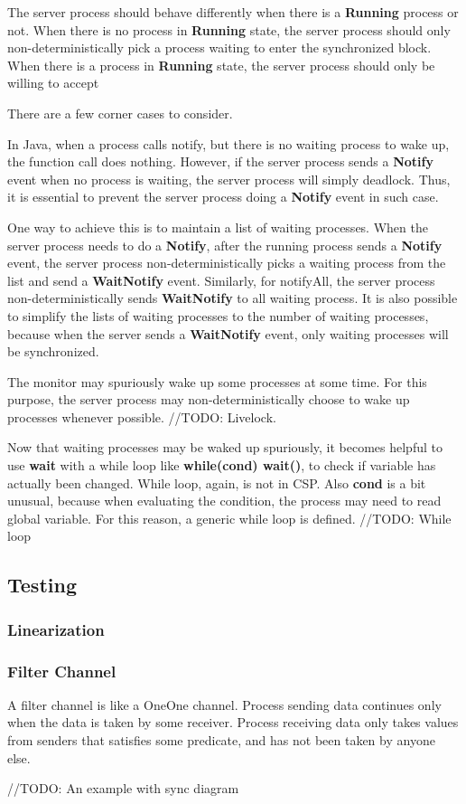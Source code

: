 \documentclass{article}
\begin{document}
The server process should behave differently when there is a \textbf{Running} process or not. When there is no process in \textbf{Running} state, the server process should only non-deterministically pick a process waiting to enter the synchronized block. When there is a process in \textbf{Running} state, the server process should only be willing to accept 

There are a few corner cases to consider.

In Java, when a process calls notify, but there is no waiting process to wake up, the function call does nothing. However, if the server process sends a \textbf{Notify} event when no process is waiting, the server process will simply deadlock. Thus, it is essential to prevent the server process doing a \textbf{Notify} event in such case.

One way to achieve this is to maintain a list of waiting processes. When the server process needs to do a \textbf{Notify}, after the running process sends a \textbf{Notify} event, the server process non-deterministically picks a waiting process from the list and send a \textbf{WaitNotify} event. Similarly, for notifyAll, the server process non-deterministically sends \textbf{WaitNotify} to all waiting process. It is also possible to simplify the lists of waiting processes to the number of waiting processes, because when the server sends a \textbf{WaitNotify} event, only waiting processes will be synchronized. 

The monitor may spuriously wake up some processes at some time. For this purpose, the server process may non-deterministically choose to wake up processes whenever possible. //TODO: Livelock.

Now that waiting processes may be waked up spuriously, it becomes helpful to use \textbf{wait} with a while loop like \textbf{while(cond) wait()}, to check if variable has actually been changed. While loop, again, is not in CSP. Also \textbf{cond} is a bit unusual, because when evaluating the condition, the process may need to read global variable. For this reason, a generic while loop is defined. //TODO: While loop

\subsection{Testing}
\subsubsection{Linearization}
\subsubsection{Filter Channel}
A filter channel is like a OneOne channel. Process sending data continues only when the data is taken by some receiver. Process receiving data only takes values from senders that satisfies some predicate, and has not been taken by anyone else. 

//TODO: An example with sync diagram
\end{document}
